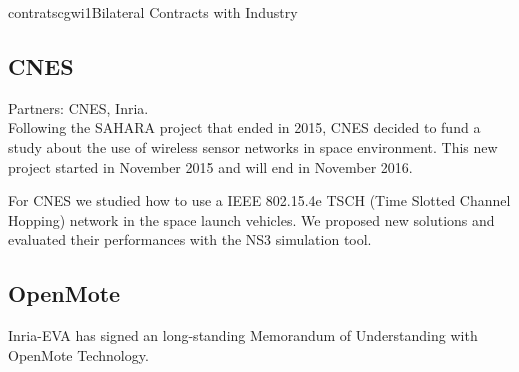 \documentclass{ra2016}
\begin{document}
\begin{module}{contrats}{cgwi1}{Bilateral Contracts with Industry}

\subsection{CNES}

\begin{participants}
\end{participants}

Partners: CNES, Inria.\\

Following the SAHARA project that ended in 2015, CNES decided to fund a study about the use of wireless sensor networks in space environment.
This new project started in November 2015 and will end in November 2016.

For CNES we studied how to use a IEEE 802.15.4e TSCH (Time Slotted Channel Hopping) network in the space launch vehicles. We proposed new solutions and evaluated their performances with the NS3 simulation tool.\\

\subsection{OpenMote}

\begin{participants}
\end{participants}

Inria-EVA has signed an long-standing Memorandum of Understanding with OpenMote Technology.

\end{module}
\end{document}
